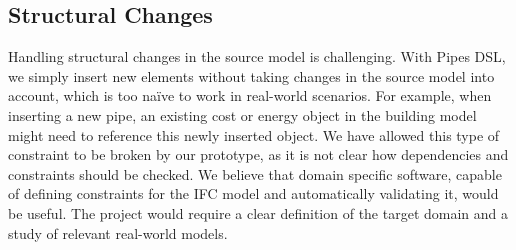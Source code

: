 \subsection{Structural Changes}
Handling structural changes in the source model is challenging. With Pipes DSL, we simply insert new elements without taking changes in the source model into account, which is too na\"{i}ve to work in real-world scenarios. For example, when inserting a new pipe, an existing cost or energy object in the building model might need to reference this newly inserted object. We have allowed this type of constraint to be broken by our prototype, as it is not clear how dependencies and constraints should be checked. We believe that domain specific software, capable of defining constraints for the IFC model and automatically validating it, would be useful. The project would require a clear definition of the target domain and a study of relevant real-world models.





